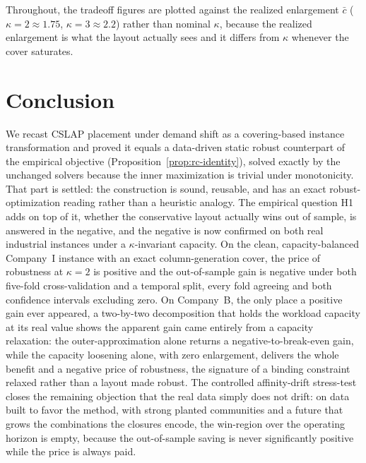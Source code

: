 \documentclass[preprint,review,11pt,authoryear]{elsarticle}
\begin{document}
Throughout, the tradeoff figures are plotted against the realized enlargement $\bar c$ ($\kappa=2 \approx 1.75$, $\kappa=3 \approx 2.2$) rather than nominal $\kappa$, because the realized enlargement is what the layout actually sees and it differs from $\kappa$ whenever the cover saturates.

\section{Conclusion}\label{sec:rc-conclusion}

We recast CSLAP placement under demand shift as a covering-based instance transformation and proved it equals a data-driven static robust counterpart of the empirical objective (Proposition~\ref{prop:rc-identity}), solved exactly by the unchanged solvers because the inner maximization is trivial under monotonicity. That part is settled: the construction is sound, reusable, and has an exact robust-optimization reading rather than a heuristic analogy. The empirical question H1 adds on top of it, whether the conservative layout actually wins out of sample, is answered in the negative, and the negative is now confirmed on both real industrial instances under a $\kappa$-invariant capacity. On the clean, capacity-balanced Company~I instance with an exact column-generation cover, the price of robustness at $\kappa=2$ is positive and the out-of-sample gain is negative under both five-fold cross-validation and a temporal split, every fold agreeing and both confidence intervals excluding zero. On Company~B, the only place a positive gain ever appeared, a two-by-two decomposition that holds the workload capacity at its real value shows the apparent gain came entirely from a capacity relaxation: the outer-approximation alone returns a negative-to-break-even gain, while the capacity loosening alone, with zero enlargement, delivers the whole benefit and a negative price of robustness, the signature of a binding constraint relaxed rather than a layout made robust. The controlled affinity-drift stress-test closes the remaining objection that the real data simply does not drift: on data built to favor the method, with strong planted communities and a future that grows the combinations the closures encode, the win-region over the operating horizon is empty, because the out-of-sample saving is never significantly positive while the price is always paid.
\end{document}
